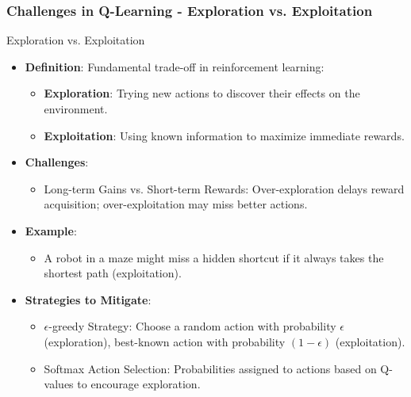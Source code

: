 \documentclass[aspectratio=169]{beamer}
\begin{document}
\begin{frame}[fragile]
    \frametitle{Challenges in Q-Learning - Exploration vs. Exploitation}
    \begin{block}{Exploration vs. Exploitation}
        \begin{itemize}
            \item \textbf{Definition}: Fundamental trade-off in reinforcement learning:
            \begin{itemize}
                \item \textbf{Exploration}: Trying new actions to discover their effects on the environment.
                \item \textbf{Exploitation}: Using known information to maximize immediate rewards.
            \end{itemize}
            \item \textbf{Challenges}:
            \begin{itemize}
                \item Long-term Gains vs. Short-term Rewards: Over-exploration delays reward acquisition; over-exploitation may miss better actions.
            \end{itemize}
            \item \textbf{Example}: 
            \begin{itemize}
                \item A robot in a maze might miss a hidden shortcut if it always takes the shortest path (exploitation).
            \end{itemize}
            \item \textbf{Strategies to Mitigate}:
            \begin{itemize}
                \item \(\epsilon\)-greedy Strategy: Choose a random action with probability $\epsilon$ (exploration), best-known action with probability $(1-\epsilon)$ (exploitation).
                \item Softmax Action Selection: Probabilities assigned to actions based on Q-values to encourage exploration.
            \end{itemize}
        \end{itemize}
    \end{block}
\end{frame}
\end{document}

